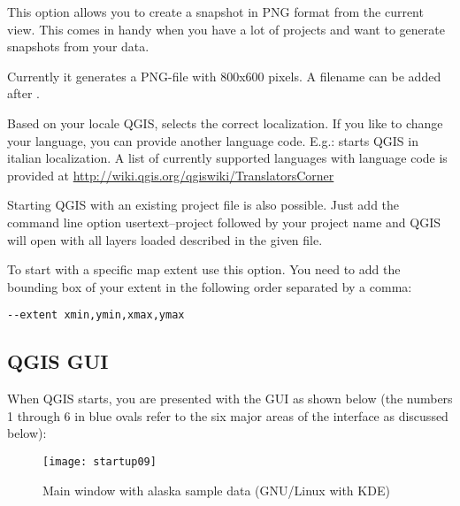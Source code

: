 \begin{Tip} \caption{\textsc{Example Using command line arguments}}
\end{Tip}

This option allows you to create a snapshot in PNG format from the current view.
This comes in handy when you have a lot of projects and want to 
generate snapshots from your data.

Currently it generates a PNG-file with 800x600 pixels. A filename can be added after
.

Based on your locale QGIS, selects the correct localization. If you like to 
change your language, you can provide another language code. E.g.: 
starts QGIS in italian localization. A list of currently supported
languages with language code is provided at
\url{http://wiki.qgis.org/qgiswiki/TranslatorsCorner} 

Starting QGIS with an existing project file is also possible. Just
add the command line option usertext{--project} followed by your project name
and QGIS will open with all layers loaded described in the given file.

To start with a specific map extent use this option. You need to add the bounding
box of your extent in the following order separated by a comma:
\begin{verbatim}
--extent xmin,ymin,xmax,ymax
\end{verbatim}


\subsection{QGIS GUI}
\label{label_qgismainwindow}

When QGIS starts, you are presented with the GUI as shown below
(the numbers 1 through 6 in blue ovals refer to the six major areas of the
interface as discussed below):

\begin{figure}[ht]
   \begin{center}
   \caption{Main window with alaska sample data (GNU/Linux with KDE)}\label{fig:startup}
   \texttt{[image: startup09]}
\end{center} 
\end{figure}

